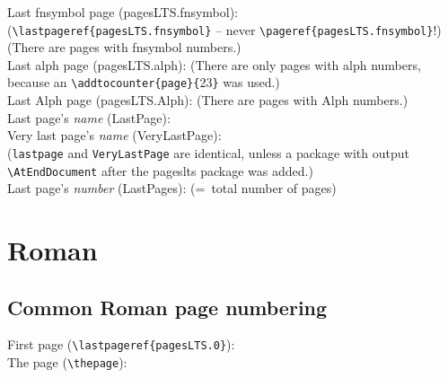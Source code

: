 \documentclass[british]{article}
\def\pagesLTSexamplealph{23}
\begin{document}
\noindent Last fnsymbol page (pagesLTS.fnsymbol):  \\
(\verb|\lastpageref{pagesLTS.fnsymbol}| -- never \verb|\pageref{pagesLTS.fnsymbol}|!)\\
(There are  pages with fnsymbol numbers.)\\

\noindent Last alph page (pagesLTS.alph): 
(There are only  pages with alph numbers,
because an \verb|\addtocounter{page}{|\pagesLTSexamplealph\verb|}| was used.)\\

\noindent Last Alph page (pagesLTS.Alph): 
(There are  pages with Alph numbers.)\\

\noindent Last page's \textit{name} (LastPage): \\

\noindent Very last page's \textit{name} (VeryLastPage): \\
(\texttt{lastpage} and \texttt{VeryLastPage} are identical, unless
a package with output \linebreak
\verb|\AtEndDocument| after the \textsf{pageslts} package was added.)\\

\noindent Last page's \textit{number} (LastPages): 
(=~total number of pages)\\

\lipsum[1-3]

\newpage


\section{Roman\label{Roman}}
\subsection{Common Roman page numbering}

\noindent First page (\verb|\lastpageref{pagesLTS.0}|):
\\

\noindent The page (\verb|\thepage|): \thepage \\
\end{document}
